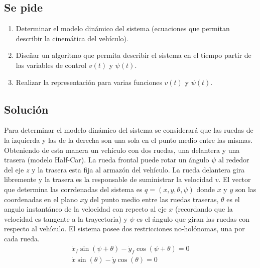 \documentclass[twoside]{article}
\begin{document}
\begin{multicols}{2}
\subsection{Se pide}
\begin{enumerate}
\def\labelenumi{\arabic{enumi}.}
\itemsep1pt\parskip0pt
\item
  Determinar el modelo dinámico del sistema (ecuaciones que permitan
  describir la cinemática del vehículo).

\def\labelenumii{\arabic{enumii}.}
\setcounter{enumii}{1}
\itemsep1pt\parskip0pt
\item
    Diseñar un algoritmo que permita describir el sistema en el tiempo
    partir de las variables de control \(v(t)\) y \(\psi(t)\).


\def\labelenumiii{\arabic{enumiii}.}
\setcounter{enumiii}{2}
\itemsep1pt\parskip0pt
\item
      Realizar la representación para varias funciones \(v(t)\) y
      \(\psi(t)\).

\end{enumerate}

\subsection{Solución}
Para determinar el modelo dinámico del sistema se
considerará que las ruedas de la izquierda y las de la derecha son una
sola en el punto medio entre las mismas. Obteniendo de esta manera un
vehículo con dos ruedas, una delantera y una trasera (modelo Half-Car).
La rueda frontal puede rotar un ángulo \(\psi\) al rededor del eje \(z\) y la trasera
esta fija al armazón del vehículo. La rueda delantera gira libremente y
la trasera es la responsable de suministrar la velocidad \(v\). El
vector que determina las corrdenadas del sistema es
\(q = (x, y, \theta, \psi)\) donde \(x\) y \(y\) son las coordenadas en
el plano \(xy\) del punto medio entre las ruedas traseras, \(\theta\) es
el angulo instantáneo de la velocidad con repecto al eje \(x\)
(recordando que la velocidad es tangente a la trayectoria) y \(\psi\) es
el ángulo que giran las ruedas con respecto al vehículo. El sistema
posee dos restricciones no-holónomas, una por cada rueda. \\
\begin{equation}
\label{ec_1}
\begin{array}{lcl} \dot{x}_{f} \sin{\left (\psi + \theta \right )} - \dot{y}_{f} \cos{\left (\psi + \theta \right )} = 0 \\ 
\dot{x} \sin{\left (\theta \right )} - \dot{y} \cos{\left (\theta \right )} = 0 \end{array}
\end{equation} 


\end{multicols}
\end{document}
